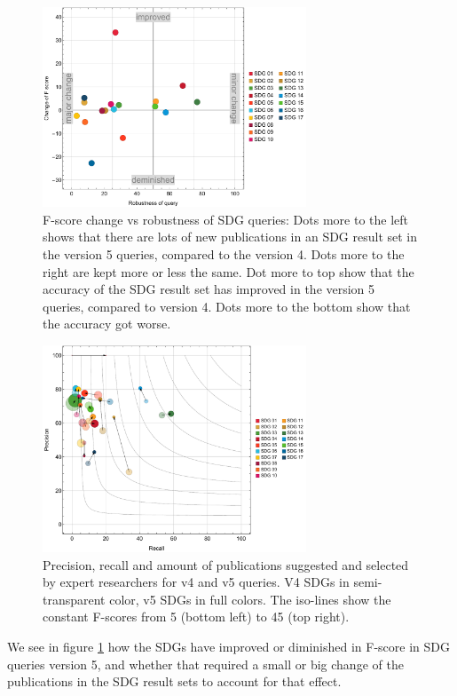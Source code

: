 \documentclass{article}
\begin{document}
\begin{figure}[H]
	\centering
  \includegraphics[width=0.7\textwidth]{figures/scatterplot1-fscore-robustness.pdf}
	\caption{F-score change vs robustness of SDG queries: Dots more to the left shows that there are lots of new publications in an SDG result set in the version 5 queries, compared to the version 4. Dots more to the right are kept more or less the same. Dot more to top show that the accuracy of the SDG result set has improved in the version 5 queries, compared to version 4. Dots more to the bottom show that the accuracy got worse.}
	\label{fscore-vs-robustnes}
\end{figure}
\begin{figure}[H]
	\centering
  \includegraphics[width=0.7\textwidth]{figures/bubblechart2.pdf}
	\caption{Precision, recall and amount of publications suggested and selected by expert researchers for v4 and v5 queries. V4 SDGs in semi-transparent color, v5 SDGs in full colors. The iso-lines show the constant F-scores from 5 (bottom left) to 45 (top right). }
	\label{bubblechart}
\end{figure}

We see in figure \ref{fscore-vs-robustnes} how the SDGs have improved or diminished in F-score in SDG queries version 5, and whether that required a small or big change of the publications in the SDG result sets to account for that effect.
\end{document}
